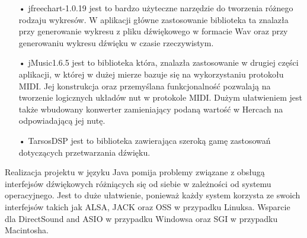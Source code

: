 \begin{itemize}
\item[•]{jfreechart-1.0.19 jest to bardzo użyteczne narzędzie do tworzenia różnego rodzaju wykresów. W aplikacji główne zastosowanie biblioteka ta znalazła przy generowanie wykresu z pliku dźwiękowego w formacie Wav oraz przy generowaniu wykresu dźwięku w czasie rzeczywistym.}
\item[•]{jMusic1.6.5 jest to biblioteka która, znalazła zastosowanie w drugiej części aplikacji, w której w dużej mierze bazuje się na wykorzystaniu protokołu MIDI. Jej konstrukcja oraz przemyślana funkcjonalność pozwalają na tworzenie logicznych układów nut w protokole MIDI. Dużym ułatwieniem jest także wbudowany konwerter zamieniający podaną wartość w Hercach na odpowiadającą jej nutę.}
\item[•]{TarsosDSP jest to biblioteka zawierająca szeroką gamę zastosowań dotyczących przetwarzania dźwięku.}
\end{itemize}
Realizacja projektu w języku Java pomija problemy związane z obsługą interfejsów dźwiękowych różniących się od siebie w zależności od systemu operacyjnego. Jest to duże ułatwienie, ponieważ każdy system korzysta ze swoich interfejsów takich jak ALSA, JACK oraz OSS w przypadku Linuksa. Wsparcie dla DirectSound and ASIO w przypadku Windowsa oraz SGI w przypadku Macintosha.